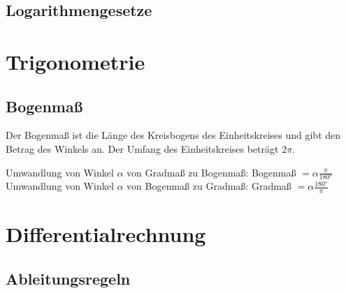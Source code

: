 \documentclass[12pt]{article}
\begin{document}
\subsection{Logarithmengesetze}
\begin{center}
\end{center}

\newpage
\section{Trigonometrie}
\subsection{Bogenmaß}
Der Bogenmaß ist die Länge des Kreisbogens des Einheitskreises und gibt den Betrag des Winkels an. Der Umfang des Einheitskreises beträgt $2\pi$.
\begin{center}
\end{center}
Umwandlung von Winkel $\alpha$ von Gradmaß zu Bogenmaß: Bogenmaß $= \alpha \frac{\pi}{\text{180°}}$
Umwandlung von Winkel $\alpha$ von Bogenmaß zu Gradmaß: Gradmaß $= \alpha \frac{\text{180°}}{\pi}$

\section{Differentialrechnung}
\subsection{Ableitungsregeln}
\end{document}
